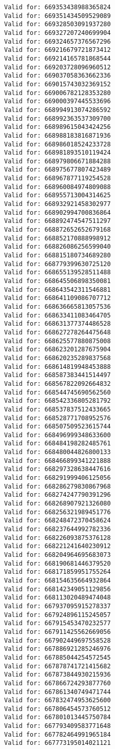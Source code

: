 \documentclass[11pt]{article}
\begin{document}
\begin{Verbatim}[commandchars=\\\{\}]
Valid for: 669353438988365824
Valid for: 669351434509529089
Valid for: 669328503091937280
Valid for: 669327207240699904
Valid for: 669324657376567296
Valid for: 669216679721873412
Valid for: 669214165781868544
Valid for: 669203728096960512
Valid for: 669037058363662336
Valid for: 669015743032369152
Valid for: 669006782128353280
Valid for: 669000397445533696
Valid for: 668994913074286592
Valid for: 668992363537309700
Valid for: 668989615043424256
Valid for: 668988183816871936
Valid for: 668986018524233728
Valid for: 668981893510119424
Valid for: 668979806671884288
Valid for: 668975677807423489
Valid for: 668967877119254528
Valid for: 668960084974809088
Valid for: 668955713004314625
Valid for: 668932921458302977
Valid for: 668902994700836864
Valid for: 668892474547511297
Valid for: 668872652652679168
Valid for: 668852170888998912
Valid for: 668826086256599040
Valid for: 668815180734689280
Valid for: 668779399630725120
Valid for: 668655139528511488
Valid for: 668645506898350081
Valid for: 668643542311546881
Valid for: 668641109086707712
Valid for: 668636665813057536
Valid for: 668633411083464705
Valid for: 668631377374486528
Valid for: 668627278264475648
Valid for: 668625577880875008
Valid for: 668623201287675904
Valid for: 668620235289837568
Valid for: 668614819948453888
Valid for: 668587383441514497
Valid for: 668567822092664832
Valid for: 668544745690562560
Valid for: 668542336805281792
Valid for: 668537837512433665
Valid for: 668528771708952576
Valid for: 668507509523615744
Valid for: 668496999348633600
Valid for: 668484198282485761
Valid for: 668480044826800133
Valid for: 668466899341221888
Valid for: 668297328638447616
Valid for: 668291999406125056
Valid for: 668286279830867968
Valid for: 668274247790391296
Valid for: 668268907921326080
Valid for: 668256321989451776
Valid for: 668248472370458624
Valid for: 668237644992782336
Valid for: 668226093875376128
Valid for: 668221241640230912
Valid for: 668204964695683073
Valid for: 668190681446379520
Valid for: 668171859951755264
Valid for: 668154635664932864
Valid for: 668142349051129856
Valid for: 668113020489474048
Valid for: 667937095915278337
Valid for: 667924896115245057
Valid for: 667915453470232577
Valid for: 667911425562669056
Valid for: 667902449697558528
Valid for: 667886921285246976
Valid for: 667885044254572545
Valid for: 667878741721415682
Valid for: 667873844930215936
Valid for: 667866724293877760
Valid for: 667861340749471744
Valid for: 667832474953625600
Valid for: 667806454573760512
Valid for: 667801013445750784
Valid for: 667793409583771648
Valid for: 667782464991965184
Valid for: 667773195014021121

\end{Verbatim}
\end{document}
